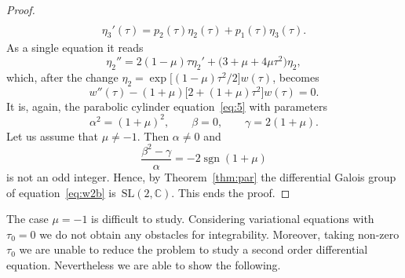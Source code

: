 \documentclass[pdftex]{sigma}
\DeclareMathOperator{\sgn}{sgn}
\numberwithin{equation}{section}
\begin{document}
\begin{proof}
\begin{gather*}
 \\
 \eta_3'(\tau) = p_2(\tau) \eta_2(\tau) + p_1(\tau)\eta_3(\tau).
 \end{gather*}
 As a single equation it reads
 \begin{equation*}
 \eta_2'' = 2(1-\mu)\tau \eta_2' + \big(3+\mu+4\mu \tau^2\big)\eta_2,
 \end{equation*}
 which, after the change $\eta_2=\exp\big[(1-\mu)\tau^2/2\big]w(\tau)$, becomes
 \begin{equation}
 \label{eq:w2b}
 w''(\tau) -(1+\mu)\big[2 +(1+\mu)\tau^2\big]w(\tau)=0.
 \end{equation}
 It is, again, the parabolic cylinder equation~\eqref{eq:5} with parameters
 \begin{equation*}
 \alpha^2= (1+\mu)^2, \qquad
 \beta=0, \qquad
 \gamma = 2(1+\mu).
 \end{equation*}
 Let us assume that $\mu\neq-1$. Then $\alpha\neq 0$ and
 \[
 \frac{\beta^2-\gamma}{\alpha}=-2\sgn(1+\mu)
 \]
 is not an odd integer. Hence, by Theorem~\ref{thm:par} the
 differential Galois group of equation~\eqref{eq:w2b} is~$\mathrm{SL}(2,\mathbb{C})$. This ends the proof.
\end{proof}

The case $\mu=-1$ is difficult to study. Considering variational
equations with $\tau_0=0$ we do not obtain any obstacles for
integrability. Moreover, taking non-zero $\tau_0$ we are unable to
reduce the problem to study a second order differential equation.
Nevertheless we are able to show the following.
\end{document}

